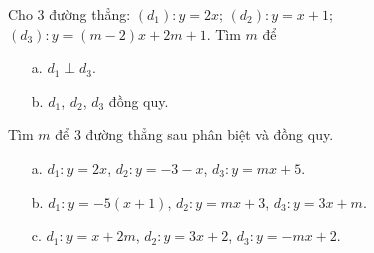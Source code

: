 \begin{bt}%
	Cho $3$ đường thẳng: $(d_1): y=2x$; $(d_2): y=x+1$; $(d_3): y=(m-2)x+2m+1$. Tìm $m$ để 
	\begin{itemize}
		\item [a.] $d_1 \perp d_3$.
		\item [b.] $d_1$, $d_2$, $d_3$ đồng quy.
	\end{itemize}
\end{bt}

\begin{bt}%
	Tìm $m$ để $3$ đường thẳng sau phân biệt và đồng quy.
	\begin{itemize}
		\item [a.] $d_1: y=2x$, $d_2: y=-3-x$, $d_3: y=mx+5$.
		\item [b.] $d_1: y=-5(x+1)$, $d_2: y=mx+3$, $d_3: y=3x+m$.
		\item [c.] $d_1: y=x+2m$, $d_2: y=3x+2$, $d_3: y=-mx+2$.
	\end{itemize}
\end{bt}

